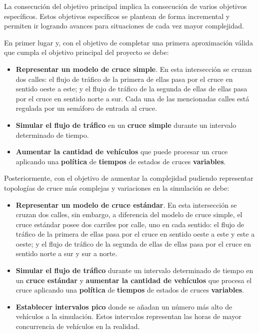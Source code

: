 La consecución del objetivo principal implica la consecución de varios objetivos específicos. Estos objetivos específicos se plantean de forma incremental y permiten ir logrando avances para situaciones de cada vez mayor complejidad.

En primer lugar y, con el objetivo de completar una primera aproximación válida que cumpla el objetivo principal del proyecto se debe:
\begin{itemize}
    \item \textbf{Representar un modelo de cruce simple}. En esta intersección se cruzan dos calles: el flujo de tráfico de la primera de ellas pasa por el cruce en sentido oeste a este; y el flujo de tráfico de la segunda de ellas de ellas pasa por el cruce en sentido norte a sur. Cada una de las mencionadas calles está regulada por un semáforo de entrada al cruce.
    \item \textbf{Simular el flujo de tráfico} en un \textbf{cruce simple} durante un intervalo determinado de tiempo.
    \item \textbf{Aumentar la cantidad de vehículos} que puede procesar un cruce aplicando una \textbf{política} de \textbf{tiempos} de estados de cruces \textbf{variables}.
\end{itemize}

Posteriormente, con el objetivo de aumentar la complejidad pudiendo representar topologías de cruce más complejas y variaciones en la simulación se debe:
\begin{itemize}
    \item \textbf{Representar un modelo de cruce estándar}. En esta intersección se cruzan dos calles, sin embargo, a diferencia del modelo de cruce simple, el cruce estándar posee dos carriles por calle, uno en cada sentido: el flujo de tráfico de la primera de ellas pasa por el cruce en sentido oeste a este y este a oeste; y el flujo de tráfico de la segunda de ellas de ellas pasa por el cruce en sentido norte a sur y sur a norte.
    \item \textbf{Simular el flujo de tráfico} durante un intervalo determinado de tiempo en un \textbf{cruce estándar} y \textbf{aumentar la cantidad de vehículos} que procesa el cruce aplicando una \textbf{política} de \textbf{tiempos} de estados de cruces \textbf{variables}.
    \item \textbf{Establecer intervalos pico} donde se añadan un número más alto de vehículos a la simulación. Estos intervalos representan las horas de mayor concurrencia de vehículos en la realidad.
\end{itemize}

